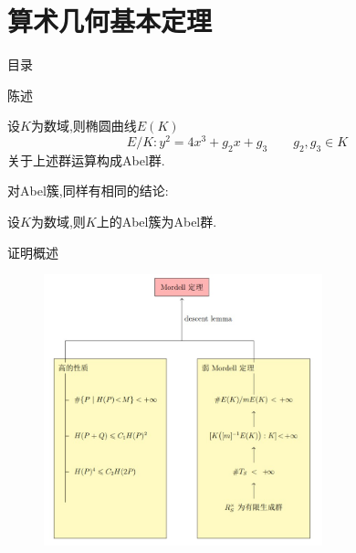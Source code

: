 \documentclass[pdf]{beamer}
\numberwithin{equation}{section}
\theoremstyle{plain}
\theoremstyle{plain}
\theoremstyle{plain}
\theoremstyle{remark}
\begin{document}
\section{算术几何基本定理}
\begin{frame}{目录}
\tableofcontents[currentsection]
\end{frame}
\begin{frame}[fragile]{陈述}
\begin{theorem}[Mordell定理]
	\hspace*{20pt}设$K$为数域,则椭圆曲线$E(K)$
	$$E/K:y^2=4x^3+g_2x+g_3 \qquad g_2,g_3 \in K$$
	关于上述群运算构成Abel群.
\end{theorem}
对Abel簇,同样有相同的结论:
\begin{theorem}
	\hspace*{20pt}设$K$为数域,则$K$上的Abel簇为Abel群.
\end{theorem}
\end{frame}
\begin{frame}[fragile]{证明概述}
\vspace{-1cm}
	\begin{figure}[th]
	\begin{minipage}[b]{\textwidth}
		\centering
		\includegraphics[width=0.72\textwidth]{mordell1.jpg}
		\label{fig2}
	\end{minipage}
\end{figure}
\end{frame}
\end{document}
